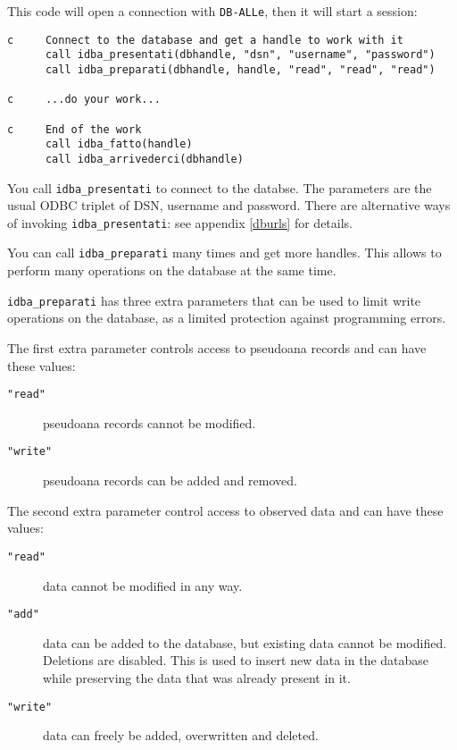 \documentclass[final,12pt,a4paper,twoside]{book}
\newcommand{\dballe}{{\tt DB-ALLe}}
\begin{document}
This code will open a connection with \dballe{}, then it will start a session:

\label{fun-idba_presentati}
\label{fun-idba_preparati}

\begin{verbatim}
c     Connect to the database and get a handle to work with it
      call idba_presentati(dbhandle, "dsn", "username", "password")
      call idba_preparati(dbhandle, handle, "read", "read", "read")

c     ...do your work...

c     End of the work
      call idba_fatto(handle)
      call idba_arrivederci(dbhandle)
\end{verbatim}

You call {\tt idba\_presentati} to connect to the databse. The parameters are
the usual ODBC triplet of DSN, username and password. 
There are alternative ways of invoking {\tt idba\_presentati}: see appendix
\ref{dburls} for details.

You can call {\tt idba\_preparati} many times and get more handles.  This allows
to perform many operations on the database at the same time.

{\tt idba\_preparati} has three extra parameters that can be used to limit
write operations on the database, as a limited protection against programming
errors.

The first extra parameter controls access to pseudoana records and can have
these values:

\begin{description}
\item[{\tt "read"}] pseudoana records cannot be modified.
\item[{\tt "write"}] pseudoana records can be added and removed.
\end{description}

The second extra parameter control access to observed data and can have
these values:

\begin{description}
\item[{\tt "read"}] data cannot be modified in any way.
\item[{\tt "add"}] data can be added to the database, but existing data cannot
		   be modified.  Deletions are disabled.  This is used to
		   insert new data in the database while preserving the data
		   that was already present in it.
\item[{\tt "write"}] data can freely be added, overwritten and deleted.
\end{description}
\end{document}
